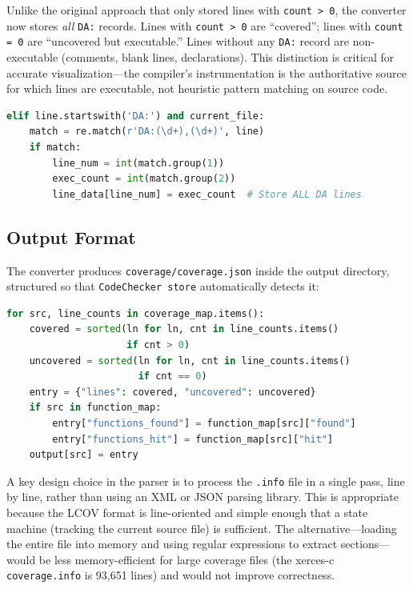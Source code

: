 Unlike the original approach that only stored lines with \texttt{count > 0}, the converter now stores \emph{all} \texttt{DA:} records. Lines with \texttt{count > 0} are ``covered''; lines with \texttt{count = 0} are ``uncovered but executable.'' Lines without any \texttt{DA:} record are non-executable (comments, blank lines, declarations). This distinction is critical for accurate visualization---the compiler's instrumentation is the authoritative source for which lines are executable, not heuristic pattern matching on source code.

\begin{lstlisting}[language=Python, caption={LCOV parsing---extracting all DA records}]
elif line.startswith('DA:') and current_file:
    match = re.match(r'DA:(\d+),(\d+)', line)
    if match:
        line_num = int(match.group(1))
        exec_count = int(match.group(2))
        line_data[line_num] = exec_count  # Store ALL DA lines
\end{lstlisting}

\subsection{Output Format}

The converter produces \texttt{coverage/coverage.json} inside the output directory, structured so that \texttt{CodeChecker store} automatically detects it:

\begin{lstlisting}[language=Python, caption={Building the output JSON}]
for src, line_counts in coverage_map.items():
    covered = sorted(ln for ln, cnt in line_counts.items()
                     if cnt > 0)
    uncovered = sorted(ln for ln, cnt in line_counts.items()
                       if cnt == 0)
    entry = {"lines": covered, "uncovered": uncovered}
    if src in function_map:
        entry["functions_found"] = function_map[src]["found"]
        entry["functions_hit"] = function_map[src]["hit"]
    output[src] = entry
\end{lstlisting}

A key design choice in the parser is to process the \texttt{.info} file in a single pass, line by line, rather than using an XML or JSON parsing library. This is appropriate because the LCOV format is line-oriented and simple enough that a state machine (tracking the current source file) is sufficient. The alternative---loading the entire file into memory and using regular expressions to extract sections---would be less memory-efficient for large coverage files (the xerces-c \texttt{coverage.info} is 93,651 lines) and would not improve correctness.

